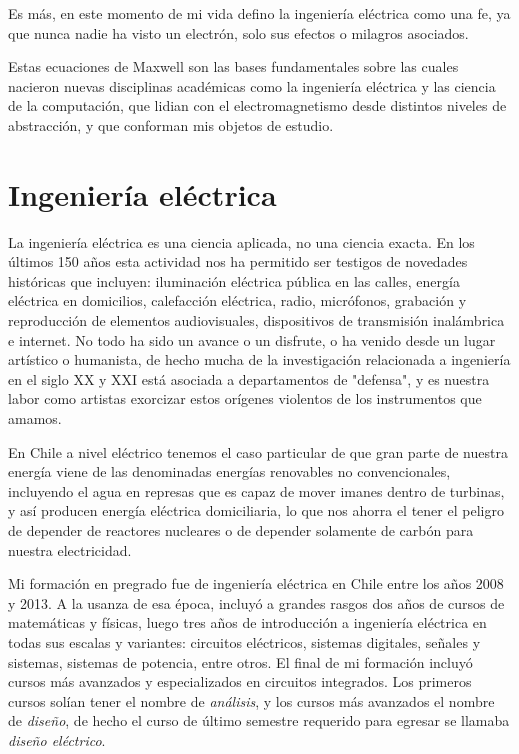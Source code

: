 \documentclass{article}
\begin{document}
Es más, en este momento de mi vida defino la ingeniería eléctrica como una fe, ya que nunca nadie ha visto un electrón, solo sus efectos o milagros asociados.

Estas ecuaciones de Maxwell son las bases fundamentales sobre las cuales nacieron nuevas disciplinas académicas como la ingeniería eléctrica y las ciencia de la computación, que lidian con el electromagnetismo desde distintos niveles de abstracción, y que conforman mis objetos de estudio.

\section{Ingeniería eléctrica}

La ingeniería eléctrica es una ciencia aplicada, no una ciencia exacta. En los últimos 150 años esta actividad nos ha permitido ser testigos de novedades históricas que incluyen: iluminación eléctrica pública en las calles, energía eléctrica en domicilios, calefacción eléctrica, radio, micrófonos, grabación y reproducción de elementos audiovisuales, dispositivos de transmisión inalámbrica e internet. No todo ha sido un avance o un disfrute, o ha venido desde un lugar artístico o humanista, de hecho mucha de la investigación relacionada a ingeniería en el siglo XX y XXI está asociada a departamentos de "defensa", y es nuestra labor como artistas exorcizar estos orígenes violentos de los instrumentos que amamos.

En Chile a nivel eléctrico tenemos el caso particular de que gran parte de nuestra energía  viene de las denominadas energías renovables no convencionales, incluyendo el agua en represas que es capaz de mover imanes dentro de turbinas, y así producen energía eléctrica domiciliaria, lo que nos ahorra el tener el peligro de depender de reactores nucleares o de depender solamente de carbón para nuestra electricidad.

Mi formación en pregrado fue de ingeniería eléctrica en Chile entre los años 2008 y 2013. A la usanza de esa época, incluyó a grandes rasgos dos años de cursos de matemáticas y físicas, luego tres años de introducción a ingeniería eléctrica en todas sus escalas y variantes: circuitos eléctricos, sistemas digitales, señales y sistemas, sistemas de potencia, entre otros. El final de mi formación incluyó cursos más avanzados y especializados en circuitos integrados. Los primeros cursos solían tener el nombre de \textit{análisis}, y los cursos más avanzados el nombre de \textit{diseño}, de hecho el curso de último semestre requerido para egresar se llamaba \textit{diseño eléctrico}. 
\end{document}
